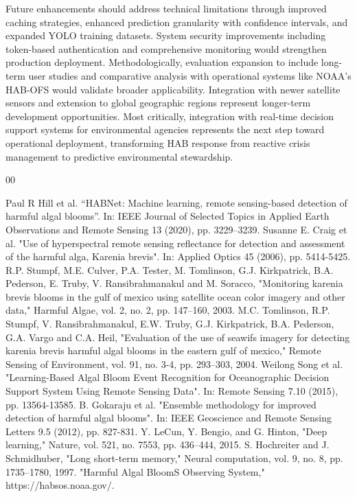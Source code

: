 \documentclass[conference]{IEEEtran}
\begin{document}
Future enhancements should address technical limitations through improved caching strategies, enhanced prediction granularity with confidence intervals, and expanded YOLO training datasets. System security improvements including token-based authentication and comprehensive monitoring would strengthen production deployment. Methodologically, evaluation expansion to include long-term user studies and comparative analysis with operational systems like NOAA's HAB-OFS would validate broader applicability. Integration with newer satellite sensors and extension to global geographic regions represent longer-term development opportunities. Most critically, integration with real-time decision support systems for environmental agencies represents the next step toward operational deployment, transforming HAB response from reactive crisis management to predictive environmental stewardship.

\begin{thebibliography}{00}

 Paul R Hill et al. “HABNet: Machine learning, remote sensing-based detection of harmful algal blooms”.
In: IEEE Journal of Selected Topics in Applied Earth Observations and Remote Sensing 13 (2020),
pp. 3229–3239.
 Susanne E. Craig et al. "Use of hyperspectral remote sensing reflectance for detection and assessment of the harmful alga, Karenia brevis". In: Applied Optics 45 (2006), pp. 5414-5425.
 R.P. Stumpf, M.E. Culver, P.A. Tester, M. Tomlinson, G.J. Kirkpatrick, B.A. Pederson, E. Truby, V. Ransibrahmanakul and M. Soracco, "Monitoring karenia brevis blooms in the gulf of mexico using satellite ocean color imagery and other data," Harmful Algae, vol. 2, no. 2, pp. 147–160, 2003.
 M.C. Tomlinson, R.P. Stumpf, V. Ransibrahmanakul, E.W. Truby, G.J. Kirkpatrick, B.A. Pederson, G.A. Vargo and C.A. Heil, "Evaluation of the use of seawifs imagery for detecting karenia brevis harmful algal blooms in the eastern gulf of mexico," Remote Sensing of Environment, vol. 91, no. 3-4, pp. 293–303, 2004.
 Weilong Song et al. "Learning-Based Algal Bloom Event Recognition for Oceanographic Decision Support System Using Remote Sensing Data". In: Remote Sensing 7.10 (2015), pp. 13564-13585.
 B. Gokaraju et al. "Ensemble methodology for improved detection of harmful algal blooms". In: IEEE Geoscience and Remote Sensing Letters 9.5 (2012), pp. 827-831.
 Y. LeCun, Y. Bengio, and G. Hinton, "Deep learning," Nature, vol. 521, no. 7553, pp. 436–444, 2015.
 S. Hochreiter and J. Schmidhuber, "Long short-term memory," Neural computation, vol. 9, no. 8, pp. 1735–1780, 1997.
 "Harmful Algal BloomS Observing System," https://habsos.noaa.gov/.

\end{thebibliography}
\end{document}
